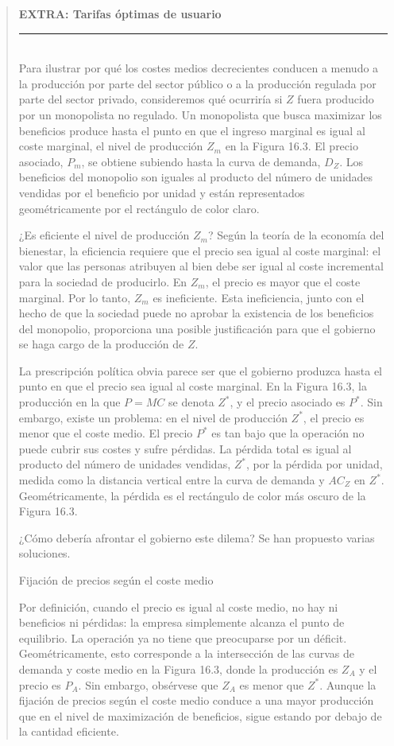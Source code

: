 \documentclass[10pt,a4paper]{article}
\newenvironment{specialblock}[1]{%
      \begin{quote} %
      \small %
      \noindent\textbf{#1}\\[-0.3em] %
      \rule{\linewidth}{0.4pt}\\[0.6em]}{
      \end{quote}}
\begin{document}
\begin{specialblock}{\textbf{EXTRA: Tarifas óptimas de usuario}}
    Para ilustrar por qué los costes medios decrecientes conducen a menudo a la producción por parte del sector público o a la producción regulada por parte del sector privado, consideremos qué ocurriría si $Z$ fuera producido por un monopolista no regulado. Un monopolista que busca maximizar los beneficios produce hasta el punto en que el ingreso marginal es igual al coste marginal, el nivel de producción $Z_m$ en la Figura 16.3. El precio asociado, $P_m$, se obtiene subiendo hasta la curva de demanda, $D_Z$. Los beneficios del monopolio son iguales al producto del número de unidades vendidas por el beneficio por unidad y están representados geométricamente por el rectángulo de color claro.
    
    ¿Es eficiente el nivel de producción $Z_m$? Según la teoría de la economía del bienestar, la eficiencia requiere que el precio sea igual al coste marginal: el valor que las personas atribuyen al bien debe ser igual al coste incremental para la sociedad de producirlo. En $Z_m$, el precio es mayor que el coste marginal. Por lo tanto, $Z_m$ es ineficiente. Esta ineficiencia, junto con el hecho de que la sociedad puede no aprobar la existencia de los beneficios del monopolio, proporciona una posible justificación para que el gobierno se haga cargo de la producción de $Z$.
    
    La prescripción política obvia parece ser que el gobierno produzca hasta el punto en que el precio sea igual al coste marginal. En la Figura 16.3, la producción en la que $P = MC$ se denota $Z^*$, y el precio asociado es $P^*$. Sin embargo, existe un problema: en el nivel de producción $Z^*$, el precio es menor que el coste medio. El precio $P^*$ es tan bajo que la operación no puede cubrir sus costes y sufre pérdidas. La pérdida total es igual al producto del número de unidades vendidas, $Z^*$, por la pérdida por unidad, medida como la distancia vertical entre la curva de demanda y $AC_Z$ en $Z^*$. Geométricamente, la pérdida es el rectángulo de color más oscuro de la Figura 16.3.
    
    ¿Cómo debería afrontar el gobierno este dilema? Se han propuesto varias soluciones.
    
    Fijación de precios según el coste medio
    
    Por definición, cuando el precio es igual al coste medio, no hay ni beneficios ni pérdidas: la empresa simplemente alcanza el punto de equilibrio. La operación ya no tiene que preocuparse por un déficit. Geométricamente, esto corresponde a la intersección de las curvas de demanda y coste medio en la Figura 16.3, donde la producción es $Z_A$ y el precio es $P_A$. Sin embargo, obsérvese que $Z_A$ es menor que $Z^*$. Aunque la fijación de precios según el coste medio conduce a una mayor producción que en el nivel de maximización de beneficios, sigue estando por debajo de la cantidad eficiente.
    

\end{specialblock}
\end{document}
